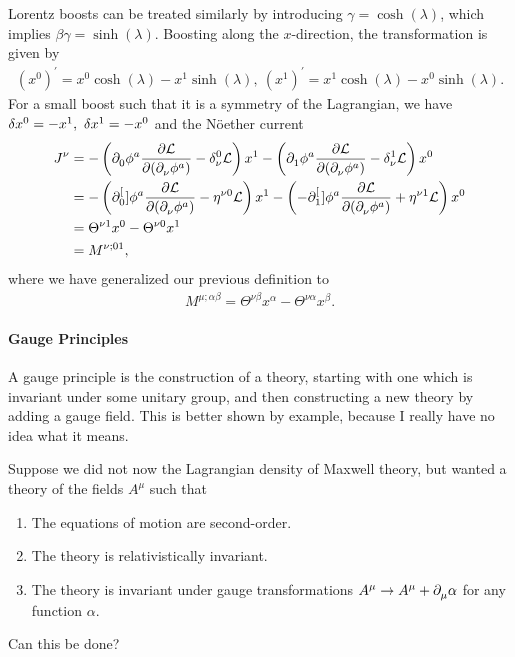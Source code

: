 Lorentz boosts can be treated similarly by introducing $\gamma = \cosh(\lambda)$, which implies $\beta\gamma = \sinh(\lambda)$. Boosting along the $x$-direction, the transformation is given by
\begin{align*}
	(x^{0})^{\prime} = x^{0}\cosh(\lambda) - x^{1}\sinh(\lambda),\ (x^{1})^{\prime} = x^{1}\cosh(\lambda) - x^{0}\sinh(\lambda).
\end{align*}
For a small boost such that it is a symmetry of the Lagrangian, we have $\var{x^{0}} = - x^{1},\ \var{x^{1}} = -x^{0}$ and the Nöether current
\begin{align*}
	J^{\nu} &= -\left(\del{}{0}{\phi^{a}}\pdv{\lag}{(\del{}{\nu}{\phi^{a}})} - \kdelta{0}{\nu}\lag\right)x^{1} - \left(\del{}{1}{\phi^{a}}\pdv{\lag}{(\del{}{\nu}{\phi^{a}})} - \kdelta{1}{\nu}\lag\right)x^{0} \\
	        &= -\left(\del[0]{}{\phi^{a}}\pdv{\lag}{(\del{}{\nu}{\phi^{a}})} - \eta^{\nu 0}\lag\right)x^{1} - \left(-\del[1]{}{\phi^{a}}\pdv{\lag}{(\del{}{\nu}{\phi^{a}})} + \eta^{\nu 1}\lag\right)x^{0} \\
	        &= \Theta^{\nu 1}x^{0} - \Theta^{\nu 0}x^{1} \\
	        &= M^{\nu;01},
\end{align*}
where we have generalized our previous definition to
\begin{align*}
	M^{\mu;\alpha\beta} = \Theta^{\nu\beta}x^{\alpha} - \Theta^{\nu\alpha}x^{\beta}.
\end{align*}

\paragraph{Gauge Principles}
A gauge principle is the construction of a theory, starting with one which is invariant under some unitary group, and then constructing a new theory by adding a gauge field. This is better shown by example, because I really have no idea what it means.

Suppose we did not now the Lagrangian density of Maxwell theory, but wanted a theory of the fields $A^{\mu}$ such that
\begin{enumerate}
	\item The equations of motion are second-order.
	\item The theory is relativistically invariant.
	\item The theory is invariant under gauge transformations $A^{\mu}\to A^{\mu} + \partial^{}_{\mu}{\alpha}$ for any function $\alpha$.
\end{enumerate}
Can this be done?

